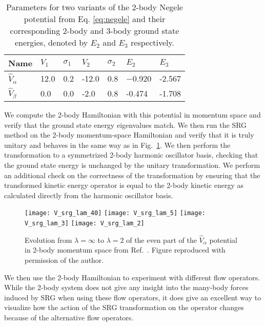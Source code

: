 \begin{table}[t]
\begin{center}
\begin{tabularx}{\textwidth}{ X X X X X X X } 
 \hline
 Name & $V_1$ & $\sigma_1$ & $V_2$ & $\sigma_2$ & $E_2$ & $E_3$ \\ 
 \hline
 $\hat{V}_\alpha$ & 12.0 & 0.2 & -12.0 & 0.8 & −0.920 & -2.567\\ 
 $\hat{V}_\beta$ & 0.0 & 0.0 & -2.0 & 0.8 & -0.474 & -1.708 \\ 
 \hline
\end{tabularx}
\end{center}
\caption{Parameters for two variants of the 2-body Negele potential from Eq. \ref{eq:negele} and their corresponding 2-body and 3-body ground state energies, denoted by $E_2$ and $E_3$ respectively.}
\label{table:negele_params}
\end{table}

We compute the 2-body Hamiltonian with this potential in momentum space and verify that the ground state energy eigenvalues match. We then run the SRG method on the 2-body momentum-space Hamiltonian and verify that it is truly unitary and behaves in the same way as in Fig.~\ref{fig:jurg_2body_ev}. We then perform the transformation to a symmetrized 2-body harmonic oscillator basis, checking that the ground state energy is unchanged by the unitary transformation. We perform an additional check on the correctness of the transformation by ensuring that the transformed kinetic energy operator is equal to the 2-body kinetic energy as calculated directly from the harmonic oscillator basis.

\begin{figure}[t]
\begin{center}
 \texttt{[image: V\_srg\_lam\_40]}
\texttt{[image: V\_srg\_lam\_5]}
 \texttt{[image: V\_srg\_lam\_3]}
 \texttt{[image: V\_srg\_lam\_2]}
\end{center}
\caption{Evolution from $\lambda=\infty$ to $\lambda=2$ of the even part of the $\hat{V}_\alpha$ potential in 2-body momentum space from Ref.~\cite{Jurgenson:2008jp}. Figure reproduced with permission of the author.}
\label{fig:jurg_2body_ev}
\end{figure}

We then use the 2-body Hamiltonian to experiment with different flow operators. While the 2-body system does not give any insight into the many-body forces induced by SRG when using these flow operators, it does give an excellent way to visualize how the action of the SRG transformation on the operator changes because of the alternative flow operators.

